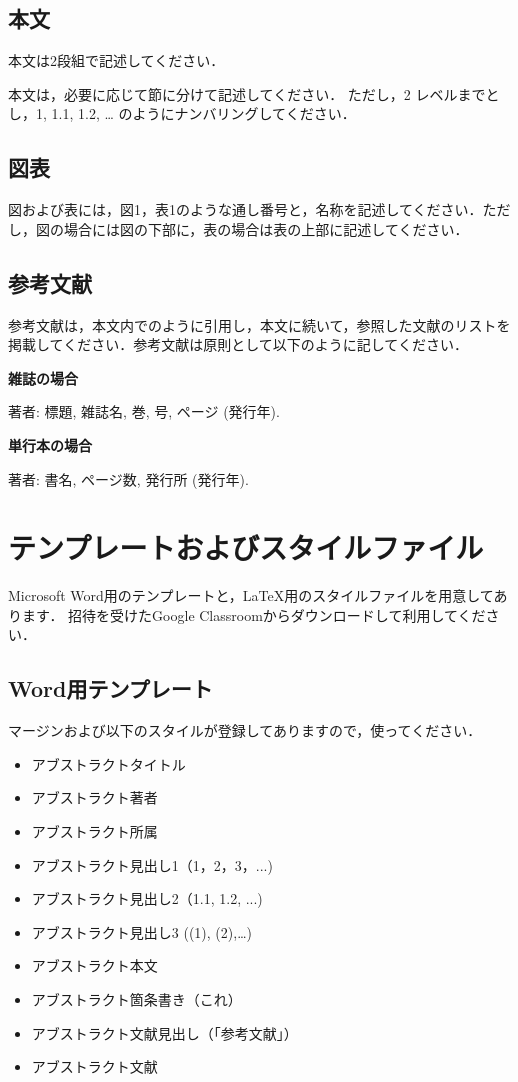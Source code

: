 \documentclass[a4paper, 9pt]{jarticle}
\begin{document}
\begin{論文概要}
\subsection{本文}
本文は2段組で記述してください．

本文は，必要に応じて節に分けて記述してください．
ただし，2 レベルまでとし，1, 1.1, 1.2, … のようにナンバリングしてください．

\subsection{図表}
図および表には，図1，表1のような通し番号と，名称を記述してください．ただし，図の場合には図の下部に，表の場合は表の上部に記述してください．

\subsection{参考文献}
参考文献は，本文内で\cite{paper1}\cite{paper2}のように引用し，本文に続いて，参照した文献のリストを掲載してください．参考文献は原則として以下のように記してください．

\begin{newenumerate}

\item {\bf 雑誌の場合}

著者: 標題, 雑誌名, 巻, 号, ページ (発行年).

\item {\bf 単行本の場合}

著者: 書名, ページ数, 発行所 (発行年).

\end{newenumerate}

\section{テンプレートおよびスタイルファイル}
Microsoft Word用のテンプレートと，\LaTeX 用のスタイルファイルを用意してあります．
招待を受けたGoogle Classroomからダウンロードして利用してください．

\subsection{Word用テンプレート}
マージンおよび以下のスタイルが登録してありますので，使ってください．
\begin{itemize}
\item アブストラクトタイトル
\item アブストラクト著者
\item アブストラクト所属
\item アブストラクト見出し1（1，2，3，...)
\item アブストラクト見出し2（1.1, 1.2, ...)
\item アブストラクト見出し3 ((1), (2),…)
\item アブストラクト本文
\item アブストラクト箇条書き（これ）
\item アブストラクト文献見出し（「参考文献」）
\item アブストラクト文献
\end{itemize}


\end{論文概要}
\end{document}
